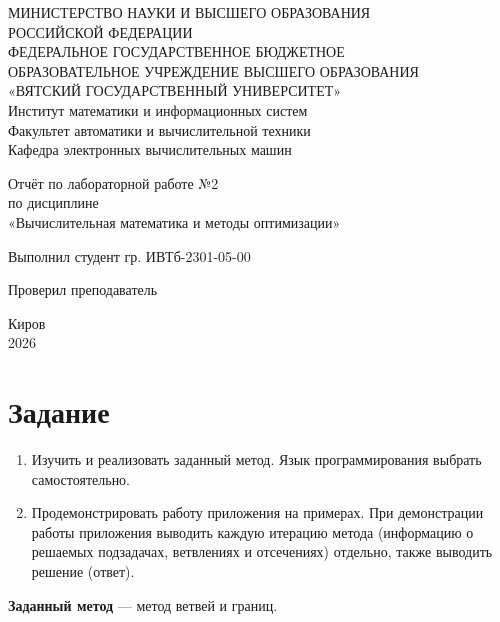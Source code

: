 \documentclass[oneside,a4paper,14pt]{extarticle}
\begin{document}
\newpage\thispagestyle{empty}
\begin{center}
    МИНИСТЕРСТВО НАУКИ И ВЫСШЕГО ОБРАЗОВАНИЯ\\
    РОССИЙСКОЙ ФЕДЕРАЦИИ\\
    ФЕДЕРАЛЬНОЕ ГОСУДАРСТВЕННОЕ БЮДЖЕТНОЕ\\
    ОБРАЗОВАТЕЛЬНОЕ УЧРЕЖДЕНИЕ ВЫСШЕГО ОБРАЗОВАНИЯ\\
    «ВЯТСКИЙ ГОСУДАРСТВЕННЫЙ УНИВЕРСИТЕТ»\\
    Институт математики и информационных систем\\
    Факультет автоматики и вычислительной техники\\
    Кафедра электронных вычислительных машин
\end{center}

\vspace{20mm}
\begin{center}

    Отчёт по лабораторной работе №2\\
    по дисциплине\\
    «Вычислительная математика и методы оптимизации»\\
\end{center}
\vfill

Выполнил студент гр. ИВТб-2301-05-00 \hfill
{}

Проверил преподаватель\hfill
{}

\vfill
\begin{center}
    Киров\\
    2026
\end{center}

\newpage
\setcounter{page}{1}
\tableofcontents
\newpage

\section{Задание}
\begin{enumerate}
    \item Изучить и реализовать заданный метод. Язык программирования выбрать самостоятельно.
    \item Продемонстрировать работу приложения на примерах. При демонстрации работы приложения выводить каждую итерацию метода (информацию о решаемых подзадачах, ветвлениях и отсечениях) отдельно, также выводить решение (ответ).
\end{enumerate}
\textbf{Заданный метод} --- метод ветвей и границ.
\end{document}
